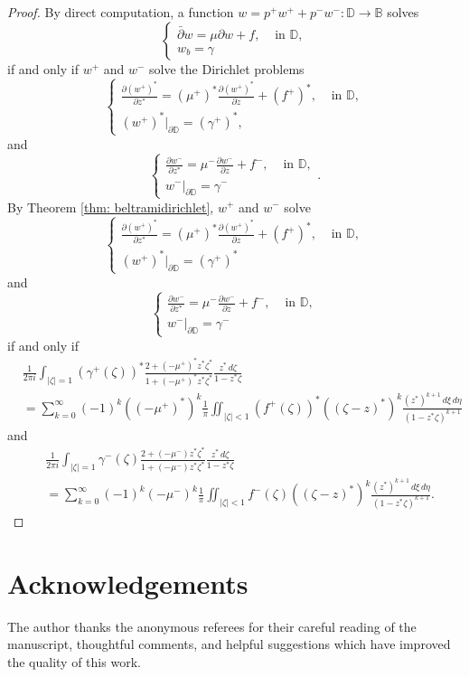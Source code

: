 \documentclass[12pt,reqno]{amsart}
\theoremstyle{definition}
\theoremstyle{remark}
\newcommand{\p}{\partial}
\newcommand{\dbar}{\bar\partial}
\newcommand{\bc}{\mathbb{B}}
\newcommand{\disk}{\mathbb{D}}
\begin{document}
\begin{proof}
    By direct computation, a function $w= p^+ w^+ + p^- w^- : \disk\to\bc$ solves 
    \[
        \begin{cases}
            \dbar w = \mu \p w + f, & \text{ in } \disk,\\
            w_b = \gamma
        \end{cases}
    \]
    if and only if $w^+$ and $w^-$ solve the Dirichlet problems 
    \[
        \begin{cases}
            \frac{\p (w^+)^*}{\p z^*} = (\mu^+)^* \frac{\p (w^+)^*}{\p z} + (f^+)^*, & \text{ in } \disk,\\
            (w^+)^*|_{\p\disk} = (\gamma^+)^*,
        \end{cases}
    \]
    and
    \[
        \begin{cases}
            \frac{\p w^-}{\p z^*} = \mu^- \frac{\p w^-}{\p z} + f^- ,& \text{ in } \disk,\\
            w^-|_{\p\disk} = \gamma^-
        \end{cases}.
    \]
    By Theorem \ref{thm: beltramidirichlet}, $w^+$ and $w^-$ solve 
    \[
        \begin{cases}
            \frac{\p (w^+)^*}{\p z^*} = (\mu^+)^* \frac{\p (w^+)^*}{\p z} + (f^+)^*, & \text{ in } \disk,\\
            (w^+)^*|_{\p\disk} = (\gamma^+)^*
        \end{cases}
    \]
    and
    \[
        \begin{cases}
            \frac{\p w^-}{\p z^*} = \mu^- \frac{\p w^-}{\p z} + f^- ,& \text{ in } \disk,\\
            w^-|_{\p\disk} = \gamma^-
        \end{cases}
    \]
    if and only if 
    \begin{align*}
        &\frac{1}{2\pi i} \int_{|\zeta| = 1} (\gamma^+(\zeta))^* \frac{2 + (-\mu^+)^* z^* \zeta^*}{1 + (-\mu^+)^* z^*\zeta^*} \frac{z^* \,d\zeta}{1-z^*\zeta} \\
        &= \sum_{k=0}^{\infty} (-1)^k ((-\mu^+)^*)^k \frac{1}{\pi} \iint_{|\zeta|<1} (f^+(\zeta))^* ((\zeta - z)^*)^k \frac{(z^*)^{k+1} \,d\xi\,d\eta}{(1-z^*\zeta)^{k+1}}
    \end{align*}
    and 
    \begin{align*}
        &\frac{1}{2\pi i} \int_{|\zeta| = 1} \gamma^-(\zeta) \frac{2 + (-\mu^-)z^* \zeta^*}{1 + (-\mu^-)z^*\zeta^*} \frac{z^* \,d\zeta}{1-z^*\zeta} \\
        &= \sum_{k=0}^{\infty} (-1)^k (-\mu^-)^k \frac{1}{\pi} \iint_{|\zeta|<1} f^-(\zeta) ((\zeta - z)^*)^k \frac{(z^*)^{k+1} \,d\xi\,d\eta}{(1-z^*\zeta)^{k+1}}.
    \end{align*}
    
\end{proof}



\section*{Acknowledgements}
The author thanks the anonymous referees for their careful reading of the manuscript, thoughtful comments, and helpful suggestions which have improved the quality of this work. 





\printbibliography
\end{document}
